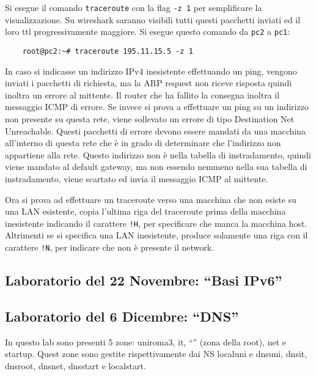 \documentclass{article}
\numberwithin{equation}{subsection}
\begin{document}

Si esegue il comando \verb|traceroute| con la flag \verb|-z 1| per semplificare la visualizzazione. Su wireshark saranno visibili tutti questi pacchetti inviati ed 
il loro ttl progressivamente maggiore. Si esegue questo comando da \verb|pc2| a \verb|pc1|:
\begin{verbatim}
    root@pc2:~# traceroute 195.11.15.5 -z 1
\end{verbatim}

In caso si indicasse un indirizzo IPv4 inesistente effettuando un ping, vengono inviati i pacchetti di richiesta, ma la ARP request non riceve 
risposta quindi inoltra un errore al mittente. Il router che ha fallito la consegna inoltra il messaggio ICMP di errore. Se invece si prova a effettuare un ping 
su un indirizzo non presente su questa rete, viene sollevato un errore di tipo Destination Net Unreachable. Questi pacchetti di errore devono essere mandati da una macchina 
all'interno di questa rete che è in grado di determinare che l'indirizzo non appartiene alla rete. Questo indirizzo non è nella tabella di instradamento, quindi 
viene mandato al default gateway, ma non essendo nemmeno nella sua tabella di instradamento, viene scartato ed invia il messaggio ICMP al mittente. 

Ora si prova ad effettuare un traceroute verso una macchina che non esiste su una LAN esistente, copia l'ultima riga del traceroute prima della macchina inesistente 
indicando il carattere \verb|!H|, per specificare che manca la macchina host. Altrimenti se si specifica una LAN inesistente, produce solamente una riga con il 
carattere \verb|!N|, per indicare che non è presente il network. 

\subsection{Laboratorio del 22 Novembre: ``Basi IPv6''}


\subsection{Laboratorio del 6 Dicembre: ``DNS''}


In questo lab sono presenti 5 zone: uniroma3, it, ``'' (zona della root), net e startup. Quest zone sono gestite rispettivamente dai NS 
localuni e dnsuni, dnsit, dnsroot, dnsnet, dnsstart e localstart. 
\end{document}
